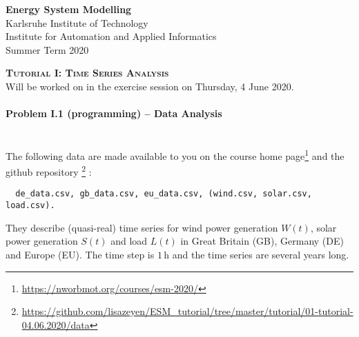 \documentclass[11pt,a4paper,fleqn]{scrartcl}
\newcommand{\e}[1]{\ensuremath{\,\mathrm{#1}}}
\begin{document}
\begin{flushright}
 \textbf{Energy System Modelling }\\
 {\small Karlsruhe Institute of Technology}\\
 {\small Institute for Automation and Applied Informatics}\\
 {\small Summer Term 2020}\\
\end{flushright}

 
 \vspace{-0.5em}
 \hrulefill
 \vspace{0.3em}

\begin{center}
 \textbf{\textsc{\Large Tutorial I: Time Series Analysis}}\\
 \small Will be worked on in the exercise session on Thursday, 4 June 2020.\\[1.5em]
\end{center}

\vspace{-0.8em}
\hrulefill
\vspace{0.8em}

\paragraph{Problem I.1 (programming) -- Data Analysis}~\\

The following data are made available to you on the course home
page\footnote{\url{https://nworbmot.org/courses/esm-2020/}} and the github repository \footnote{\url{https://github.com/lisazeyen/ESM_tutorial/tree/master/tutorial/01-tutorial-04.06.2020/data}} :
\begin{verbatim}
  de_data.csv, gb_data.csv, eu_data.csv, (wind.csv, solar.csv, load.csv).
\end{verbatim}
They describe (quasi-real) time series for wind power generation \(W(t)\), solar power generation \(S(t)\) and load \(L(t)\) in Great Britain (GB), Germany (DE) and Europe (EU). The time step is \(1\e{h}\) and the time series are several years long.
\end{document}
